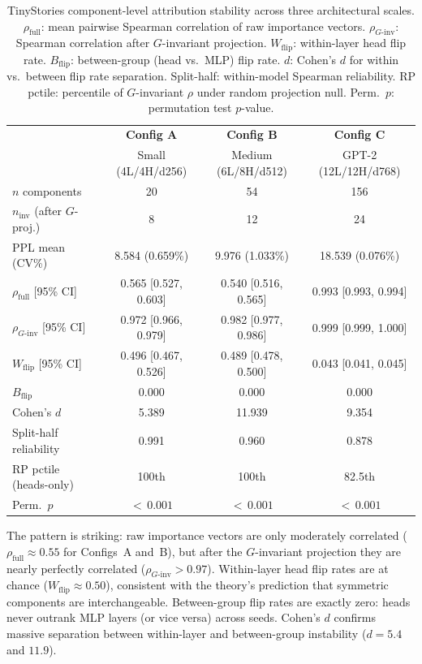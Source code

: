 \documentclass{article}
\begin{document}
\begin{table}[ht]
\centering
\caption{TinyStories component-level attribution stability across three architectural scales. $\rho_{\text{full}}$: mean pairwise Spearman correlation of raw importance vectors. $\rho_{G\text{-inv}}$: Spearman correlation after $G$-invariant projection. $W_{\text{flip}}$: within-layer head flip rate. $B_{\text{flip}}$: between-group (head vs.\ MLP) flip rate. $d$: Cohen's $d$ for within vs.\ between flip rate separation. Split-half: within-model Spearman reliability. RP pctile: percentile of $G$-invariant $\rho$ under random projection null. Perm.\ $p$: permutation test $p$-value.}
\label{tab:tinystories-results}
\small
\begin{tabular}{lccc}
\toprule
& \textbf{Config A} & \textbf{Config B} & \textbf{Config C} \\
& Small (4L/4H/d256) & Medium (6L/8H/d512) & GPT-2 (12L/12H/d768) \\
\midrule
$n$ components & 20 & 54 & 156 \\
$n_{\text{inv}}$ (after $G$-proj.) & 8 & 12 & 24 \\
PPL mean (CV\%) & 8.584 (0.659\%) & 9.976 (1.033\%) & 18.539 (0.076\%) \\
\midrule
$\rho_{\text{full}}$ [95\% CI] & 0.565 [0.527, 0.603] & 0.540 [0.516, 0.565] & 0.993 [0.993, 0.994] \\
$\rho_{G\text{-inv}}$ [95\% CI] & 0.972 [0.966, 0.979] & 0.982 [0.977, 0.986] & 0.999 [0.999, 1.000] \\
\midrule
$W_{\text{flip}}$ [95\% CI] & 0.496 [0.467, 0.526] & 0.489 [0.478, 0.500] & 0.043 [0.041, 0.045] \\
$B_{\text{flip}}$ & 0.000 & 0.000 & 0.000 \\
Cohen's $d$ & 5.389 & 11.939 & 9.354 \\
\midrule
Split-half reliability & 0.991 & 0.960 & 0.878 \\
RP pctile (heads-only) & 100th & 100th & 82.5th \\
Perm.\ $p$ & ${<}\,0.001$ & ${<}\,0.001$ & ${<}\,0.001$ \\
\bottomrule
\end{tabular}
\end{table}

The pattern is striking: raw importance vectors are only moderately correlated ($\rho_{\text{full}} \approx 0.55$ for Configs~A and~B), but after the $G$-invariant projection they are nearly perfectly correlated ($\rho_{G\text{-inv}} > 0.97$). Within-layer head flip rates are at chance ($W_{\text{flip}} \approx 0.50$), consistent with the theory's prediction that symmetric components are interchangeable. Between-group flip rates are exactly zero: heads never outrank MLP layers (or vice versa) across seeds. Cohen's $d$ confirms massive separation between within-layer and between-group instability ($d = 5.4$ and $11.9$).
\end{document}
